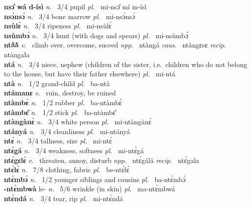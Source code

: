 {\bfseries nsɔ̂ wá d-ísì}  {\itshape n.~} 3/4 pupil {\itshape pl.~} mi-nsɔ̂ mí m-ísì    \\ 
{\bfseries nsɔ́nsɔ́}  {\itshape n.~} 3/4 bone marrow {\itshape pl.~} mi-nsɔ́nsɔ́    \\ 
{\bfseries nsùlɛ̀}  {\itshape n.~} 3/4 ripeness {\itshape pl.~} mi-nsùlɛ̀    \\ 
{\bfseries nsùmbɔ́}  {\itshape n.~} 3/4 hunt (with dogs and spears) {\itshape pl.~} mi-nsùmbɔ́    \\ 
{\bfseries ntã́ã̀}  {\itshape v.~} climb over, overcome, suceed   {\itshape npp.~} ntàngá {\itshape caus.~} ntàngɛsɛ {\itshape recip.~} ntàngala  \\ 
{\bfseries ntá}  {\itshape n.~} 3/4 niece, nephew (children of the sister, i.e.\ children who do not belong to the house, but have their father elsewhere) {\itshape pl.~} mi-ntá    \\ 
{\bfseries ntà}  {\itshape n.~} 1/2 grand-child {\itshape pl.~} ba-ntà    \\ 
{\bfseries ntámanɛ}  {\itshape v.~} ruin, destroy, be ruined    \\ 
{\bfseries ntàmbɛ̀}  {\itshape n.~} 1/2 rubber {\itshape pl.~} ba-ntàmbɛ̀    \\ 
{\bfseries ntàmbɛ̂}  {\itshape n.~} 1/2 stick {\itshape pl.~} ba-ntàmbɛ̂    \\ 
{\bfseries ntàngànɛ̀}  {\itshape n.~} 3/4 white person {\itshape pl.~} mi-ntàngànɛ̀    \\ 
{\bfseries ntányá}  {\itshape n.~} 3/4 cleanliness {\itshape pl.~} mi-ntányá    \\ 
{\bfseries ntɛ́}  {\itshape n.~} 3/4 tallness, size {\itshape pl.~} mi-ntɛ́    \\ 
{\bfseries ntɛ̀gá}  {\itshape n.~} 3/4 weakness, softness {\itshape pl.~} mi-ntɛ̀gá   \\ 
{\bfseries ntɛ́gɛlɛ̀}  {\itshape v.~} threaten, annoy, disturb   {\itshape npp.~} ntɛ́gálâ {\itshape recip.~} ntɛ́gala  \\ 
{\bfseries ntɛ́lɛ́}  {\itshape n.~} 7/8 clothing, fabric {\itshape pl.~} be-ntɛ́lɛ́    \\ 
{\bfseries ntɛ̀mbɔ́}  {\itshape n.~} 1/2 younger siblings and cousins {\itshape pl.~} ba-ntɛ̀mbɔ́    \\ 
{\bfseries -ntɛ̀mbwà} le- {\itshape n.~} 5/6 wrinkle (in skin) {\itshape pl.~} ma-ntɛ̀mbwá    \\ 
{\bfseries ntɛ̀ndá}  {\itshape n.~} 3/4 tear, rip {\itshape pl.~} mi-ntɛ̀ndá    \\ 
